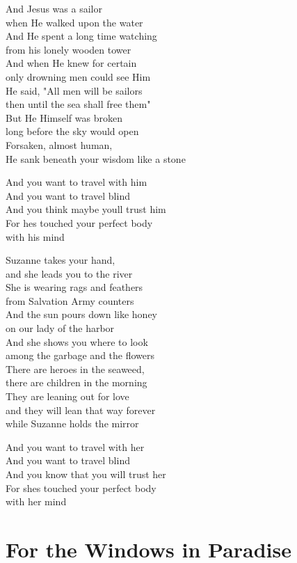 \documentclass[
  letterpaper,
]{scrbook}
\begin{document}
And Jesus was a sailor\\
when He walked upon the water\\
And He spent a long time watching\\
from his lonely wooden tower\\
And when He knew for certain\\
only drowning men could see Him\\
He said, "All men will be sailors\\
then until the sea shall free them"\\
But He Himself was broken\\
long before the sky would open\\
Forsaken, almost human,\\
He sank beneath your wisdom like a stone

And you want to travel with him\\
And you want to travel blind\\
And you think maybe you\textquotesingle ll trust him\\
For he\textquotesingle s touched your perfect body\\
with his mind

Suzanne takes your hand,\\
and she leads you to the river ~\\
She is wearing rags and feathers\\
from Salvation Army counters\\
And the sun pours down like honey\\
on our lady of the harbor\\
And she shows you where to look\\
among the garbage and the flowers\\
There are heroes in the seaweed,\\
there are children in the morning ~ ~\\
They are leaning out for love\\
and they will lean that way forever ~\\
while Suzanne holds the mirror

And you want to travel with her\\
And you want to travel blind\\
And you know that you will trust her\\
For she\textquotesingle s touched your perfect body\\
with her mind

\hypertarget{for-the-windows-in-paradise}{%
\chapter{For the Windows in
Paradise}\label{for-the-windows-in-paradise}}
\end{document}
